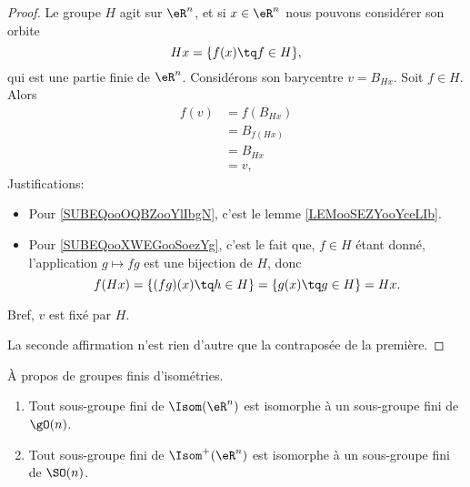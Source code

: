 \begin{proof}
	Le groupe \( H\) agit sur \( \eR^n\), et si \( x\in \eR^n\) nous pouvons considérer son orbite
	\begin{equation}
		Hx=\{f(x)\tq f\in H\},
	\end{equation}
	qui est une partie finie de \( \eR^n\). Considérons son barycentre \( v=B_{Hx}\). Soit \( f\in H\). Alors
	\begin{subequations}
		\begin{align}
			f(v) & =f(B_{Hx})                                 \\
			     & =B_{f(Hx)}     \label{SUBEQooOQBZooYlIbgN} \\
			     & =B_{Hx}        \label{SUBEQooXWEGooSoezYg} \\
			     & =v,
		\end{align}
	\end{subequations}
	Justifications:
	\begin{itemize}
		\item Pour \eqref{SUBEQooOQBZooYlIbgN}, c'est le lemme \ref{LEMooSEZYooYceLIb}.
		\item Pour \eqref{SUBEQooXWEGooSoezYg}, c'est le fait que, \( f\in H\) étant donné, l'application \( g\mapsto fg\) est une bijection de \( H\), donc
		      \begin{equation}
			      f(Hx)=\{(fg)(x)\tq h\in H\}=\{g(x)\tq g\in H\}=Hx.
		      \end{equation}
	\end{itemize}
	Bref, \( v\) est fixé par \( H\).

	La seconde affirmation n'est rien d'autre que la contraposée de la première.
\end{proof}

\begin{proposition}     \label{PROPooEUFIooDUIYzi}
	À propos de groupes finis d'isométries.
	\begin{enumerate}
		\item
		      Tout sous-groupe fini de \( \Isom(\eR^n)\) est isomorphe à un sous-groupe fini de \( \gO(n)\).
		\item
		      Tout sous-groupe fini de \( \Isom^+(\eR^n)\) est isomorphe à un sous-groupe fini de \( \SO(n)\).
	\end{enumerate}
\end{proposition}

